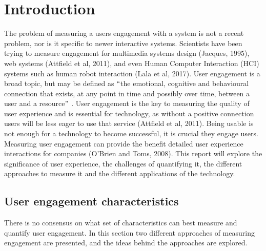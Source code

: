 \documentclass[12pt]{article}
\renewcommand{\_}{\kern-1.5pt\textunderscore\kern-1.5pt}
\begin{document}
\section*{Introduction}
The problem of measuring a users engagement with a system is not a recent problem, nor is it specific to newer interactive systems. Scientists have been trying to measure engagement for multimedia systems design (Jacques, 1995), web systems (Attfield et al, 2011), and even Human Computer Interaction (HCI) systems such as human robot interaction (Lala et al, 2017). User engagement is a broad topic, but may be defined as $``$the emotional, cognitive and behavioural connection that exists, at any point in time and possibly over time, between a user and a resource$"$ . User engagement is the key to measuring the quality of user experience and is essential for technology, as without a positive connection users will be less eager to use that service (Attfield et al, 2011). Being usable is not enough for a technology to become successful, it is crucial they engage users. Measuring user engagement can provide the benefit detailed user experience interactions for companies (O’Brien and Toms, 2008). This report will explore the significance of user experience, the challenges of quantifying it, the different approaches to measure it and the different applications of the technology.  \par

\subsection*{User engagement characteristics}
There is no consensus on what set of characteristics can best measure and quantify user engagement. In this section two different approaches of measuring engagement are presented, and the ideas behind the approaches are explored.\par
\end{document}
